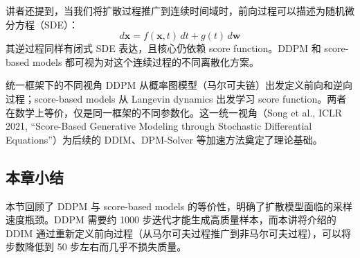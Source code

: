 讲者还提到，当我们将扩散过程推广到连续时间域时，前向过程可以描述为随机微分方程（SDE）：
$$
d\mathbf{x} = f(\mathbf{x}, t)\,dt + g(t)\,d\mathbf{w}
$$
其逆过程同样有闭式 SDE 表达，且核心仍依赖 score function。DDPM 和 score-based models 都可视为对这个连续过程的不同离散化方案。

\begin{knowledgebox}{统一框架下的不同视角}
DDPM 从概率图模型（马尔可夫链）出发定义前向和逆向过程；score-based models 从 Langevin dynamics 出发学习 score function。两者在数学上等价，仅是同一框架的不同参数化。这一统一视角（Song et al., ICLR 2021, ``Score-Based Generative Modeling through Stochastic Differential Equations''）为后续的 DDIM、DPM-Solver 等加速方法奠定了理论基础。
\end{knowledgebox}

\subsection{本章小结}

本节回顾了 DDPM 与 score-based models 的等价性，明确了扩散模型面临的采样速度瓶颈。DDPM 需要约 1000 步迭代才能生成高质量样本，而本讲将介绍的 DDIM 通过重新定义前向过程（从马尔可夫过程推广到非马尔可夫过程），可以将步数降低到 50 步左右而几乎不损失质量。


